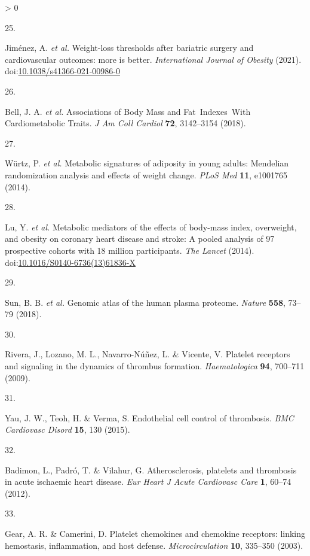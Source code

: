 \documentclass[11pt,twoside]{bristolthesis}
\newlength{\cslhangindent}
\newlength{\csllabelwidth}
\newenvironment{CSLReferences}[2] %
 {%
  \setlength{\parindent}{0pt}
  \ifodd #1 \everypar{\setlength{\hangindent}{\cslhangindent}}\ignorespaces\fi
  \ifnum #2 > 0
  \setlength{\parskip}{#2\baselineskip}
  \fi
 }%
 {}
\newcommand{\CSLLeftMargin}[1]{\parbox[t]{\csllabelwidth}{#1}}
\newcommand{\CSLRightInline}[1]{\parbox[t]{\linewidth - \csllabelwidth}{#1}\break}
\begin{document}
\begin{CSLReferences}{0}{0}
\leavevmode\hypertarget{ref-Jimenez2021}{}%
\CSLLeftMargin{25. }
\CSLRightInline{Jiménez, A. \emph{et al.} {Weight-loss thresholds after bariatric surgery and cardiovascular outcomes: more is better}. \emph{International Journal of Obesity} (2021). doi:\href{https://doi.org/10.1038/s41366-021-00986-0}{10.1038/s41366-021-00986-0}}

\leavevmode\hypertarget{ref-Bell2018a}{}%
\CSLLeftMargin{26. }
\CSLRightInline{Bell, J. A. \emph{et al.} {Associations of Body Mass and Fat~Indexes~With Cardiometabolic Traits}. \emph{J Am Coll Cardiol} \textbf{72}, 3142--3154 (2018).}

\leavevmode\hypertarget{ref-Wurtz2014}{}%
\CSLLeftMargin{27. }
\CSLRightInline{Würtz, P. \emph{et al.} {Metabolic signatures of adiposity in young adults: Mendelian randomization analysis and effects of weight change}. \emph{PLoS Med} \textbf{11}, e1001765 (2014).}

\leavevmode\hypertarget{ref-Lu2014}{}%
\CSLLeftMargin{28. }
\CSLRightInline{Lu, Y. \emph{et al.} {Metabolic mediators of the effects of body-mass index, overweight, and obesity on coronary heart disease and stroke: A pooled analysis of 97 prospective cohorts with 1{{}}8 million participants}. \emph{The Lancet} (2014). doi:\href{https://doi.org/10.1016/S0140-6736(13)61836-X}{10.1016/S0140-6736(13)61836-X}}

\leavevmode\hypertarget{ref-Sun2018}{}%
\CSLLeftMargin{29. }
\CSLRightInline{Sun, B. B. \emph{et al.} {Genomic atlas of the human plasma proteome}. \emph{Nature} \textbf{558}, 73--79 (2018).}

\leavevmode\hypertarget{ref-Rivera2009}{}%
\CSLLeftMargin{30. }
\CSLRightInline{Rivera, J., Lozano, M. L., Navarro-Núñez, L. \& Vicente, V. {Platelet receptors and signaling in the dynamics of thrombus formation}. \emph{Haematologica} \textbf{94}, 700--711 (2009).}

\leavevmode\hypertarget{ref-Yau2015}{}%
\CSLLeftMargin{31. }
\CSLRightInline{Yau, J. W., Teoh, H. \& Verma, S. {Endothelial cell control of thrombosis}. \emph{BMC Cardiovasc Disord} \textbf{15}, 130 (2015).}

\leavevmode\hypertarget{ref-Badimon2012}{}%
\CSLLeftMargin{32. }
\CSLRightInline{Badimon, L., Padró, T. \& Vilahur, G. {Atherosclerosis, platelets and thrombosis in acute ischaemic heart disease}. \emph{Eur Heart J Acute Cardiovasc Care} \textbf{1}, 60--74 (2012).}

\leavevmode\hypertarget{ref-Gear2003}{}%
\CSLLeftMargin{33. }
\CSLRightInline{Gear, A. R. \& Camerini, D. {Platelet chemokines and chemokine receptors: linking hemostasis, inflammation, and host defense}. \emph{Microcirculation} \textbf{10}, 335--350 (2003).}


\end{CSLReferences}
\end{document}
